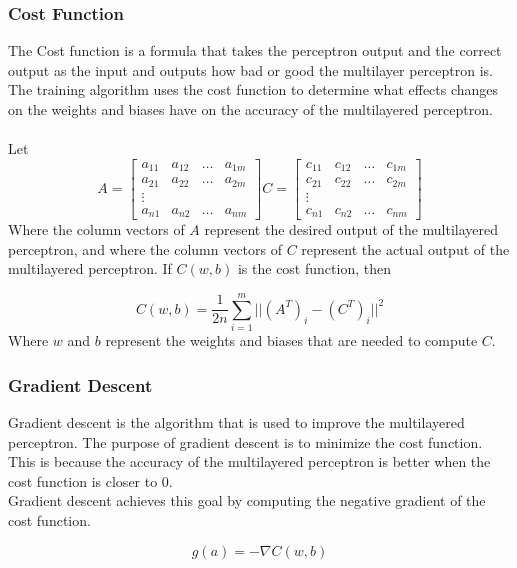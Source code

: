 \subsubsection{Cost Function}
The Cost function is a formula that takes the perceptron output and the correct output as the input and outputs how bad or good the multilayer perceptron is. The training algorithm uses the cost function to determine what effects changes on the weights and biases have on the accuracy of the multilayered perceptron.\\ \\

Let 
$$
	A = \begin{bmatrix}
		a_{11} & a_{12} & \dots & a_{1m} \\
		a_{21} & a_{22} & \dots & a_{2m} \\
		\vdots \\
		a_{n1} & a_{n2} & \dots & a_{nm}
	\end{bmatrix}
	C = \begin{bmatrix}
		c_{11} & c_{12} & \dots & c_{1m} \\
		c_{21} & c_{22} & \dots & c_{2m} \\
		\vdots \\
		c_{n1} & c_{n2} & \dots & c_{nm}
	\end{bmatrix}
$$
Where the column vectors of $A$ represent the desired output of the multilayered perceptron, and where the column vectors of $C$ represent the actual output of the multilayered perceptron. If $C(w, b)$ is the cost function, then

$$
	C(w, b) = \frac{1}{2n} \sum_{i=1}^{m} ||(A^T)_i-(C^T)_i||^2
$$
Where $w$ and $b$ represent the weights and biases that are needed to compute $C$.

\subsubsection{Gradient Descent}

Gradient descent is the algorithm that is used to improve the multilayered perceptron. The purpose of gradient descent is to minimize the cost function. This is because the accuracy of the multilayered perceptron is better when the cost function is closer to 0. \\

Gradient descent achieves this goal by computing the negative gradient of the cost function.

$$
	g(a) = -\nabla C(w,b)
$$

